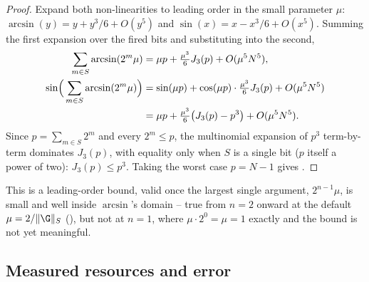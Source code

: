 \begin{proof}
Expand both non-linearities to leading order in the small parameter $\mu$:
$\arcsin(y) = y + y^3/6 + O(y^5)$ and $\sin(x) = x - x^3/6 + O(x^5)$. Summing the
first expansion over the fired bits and substituting into the second,
\begin{align}
    \sum_{m \in S} \arcsin(2^m\mu) &= \mu p + \tfrac{\mu^3}{6} J_3(p) + O(\mu^5 N^5), \\
    \sin\!\Big(\sum_{m \in S} \arcsin(2^m\mu)\Big)
        &= \sin(\mu p) + \cos(\mu p)\cdot\tfrac{\mu^3}{6}J_3(p) + O(\mu^5N^5) \notag\\
        &= \mu p + \tfrac{\mu^3}{6}\big(J_3(p) - p^3\big) + O(\mu^5N^5).
\end{align}
Since $p = \sum_{m\in S} 2^m$ and every $2^m \le p$, the multinomial expansion of
$p^3$ term-by-term dominates $J_3(p)$, with equality only when $S$ is a single bit
($p$ itself a power of two): $J_3(p) \le p^3$. Taking the worst case $p = N-1$ gives
.
\end{proof}

This is a leading-order bound, valid once the largest single argument,
$2^{n-1}\mu$, is small and well inside $\arcsin$'s domain -- true from $n=2$
onward at the default $\mu = 2/\|\G\|_S$ (), but not at $n=1$, where
$\mu \cdot 2^0 = \mu = 1$ exactly and the bound is not yet meaningful.

\subsection{Measured resources and error}
\label{app:published-resources}

